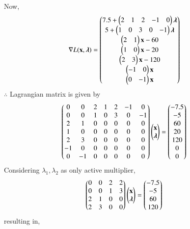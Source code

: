 \documentclass[journal,12pt,twocolumn]{IEEEtran}
\begin{document}
Now,
\begin{align}
    \nabla L(\mathbf{x},\boldsymbol{\lambda}) &= \begin{pmatrix}7.5+ \begin{pmatrix}2 & 1 & 2 & -1 & 0 \end{pmatrix}\boldsymbol{\lambda}\\ 5+\begin{pmatrix}1 & 0 & 3 & 0 & -1\end{pmatrix}\boldsymbol{\lambda} \\ \begin{pmatrix}2 & 1\end{pmatrix}\mathbf{x}-60 \\ \begin{pmatrix}1 & 0\end{pmatrix}\mathbf{x}-20 \\ \begin{pmatrix}2 & 3\end{pmatrix}\mathbf{x}-120 \\ \begin{pmatrix}-1 & 0\end{pmatrix}\mathbf{x} \\ \begin{pmatrix}0 & -1\end{pmatrix}\mathbf{x}\end{pmatrix}
\end{align}
$\therefore$ Lagrangian matrix is given by
\begin{align}
    \begin{pmatrix}0 & 0 & 2 & 1 & 2 & -1 & 0 \\ 0 & 0 & 1 & 0 & 3 & 0 & -1 \\ 2 & 1 & 0 & 0 & 0 & 0 & 0 \\ 1 & 0 & 0 & 0 & 0 & 0 & 0 \\ 2 & 3 & 0 & 0 & 0 & 0 & 0 \\ -1 & 0 & 0 & 0 & 0 & 0 & 0 \\ 0 & -1 & 0 & 0 & 0 & 0 & 0 \end{pmatrix}\begin{pmatrix}\mathbf{x} \\ \boldsymbol{\lambda} \end{pmatrix} &= \begin{pmatrix}-7.5 \\ -5 \\ 60 \\ 20 \\ 120 \\ 0 \\0 \end{pmatrix}
\end{align}
Considering $\lambda_1,\lambda_2$ as only active multiplier,
\begin{align}
    \begin{pmatrix}0 & 0 & 2 & 2 \\ 0 & 0 & 1 & 3 \\ 2 & 1 & 0 & 0 \\ 2 & 3 & 0 & 0\end{pmatrix}\begin{pmatrix}\mathbf{x}\\ \boldsymbol{\lambda}\end{pmatrix} &= \begin{pmatrix}-7.5 \\ -5 \\ 60 \\ 120\end{pmatrix}
\end{align}
resulting in,
\end{document}
